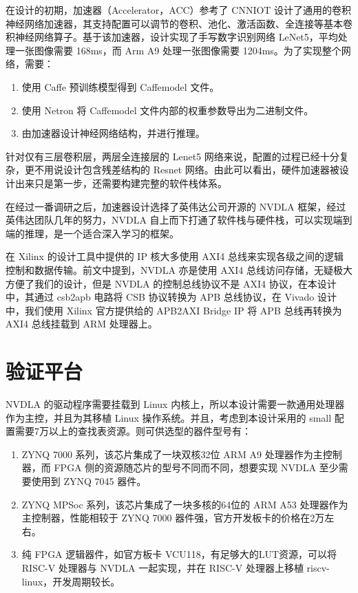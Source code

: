 在设计的初期，加速器（Accelerator，ACC）参考了 CNNIOT\cite{CNNIOT} 设计了通用的卷积神经网络加速器，其支持配置可以调节的卷积、池化、激活函数、全连接等基本卷积神经网络算子。基于该加速器，设计实现了手写数字识别网络 LeNet5，平均处理一张图像需要 168ms，而 Arm A9 处理一张图像需要 1204ms。为了实现整个网络，需要：

\begin{enumerate}
    \item 使用 Caffe 预训练模型得到 Caffemodel 文件。
    \item 使用 Netron 将 Caffemodel 文件内部的权重参数导出为二进制文件。
    \item 由加速器设计神经网络结构，并进行推理。
\end{enumerate}

针对仅有三层卷积层，两层全连接层的 Lenet5 网络来说，配置的过程已经十分复杂，更不用说设计包含残差结构的 Resnet 网络。由此可以看出，硬件加速器被设计出来只是第一步，还需要构建完整的软件栈体系。

在经过一番调研之后，加速器设计选择了英伟达公司开源的 NVDLA 框架，经过英伟达团队几年的努力，NVDLA 自上而下打通了软件栈与硬件栈，可以实现端到端的推理，是一个适合深入学习的框架。

在 Xilinx 的设计工具中提供的 IP 核大多使用 AXI4 总线来实现各级之间的逻辑控制和数据传输。前文中提到，NVDLA 亦是使用 AXI4 总线访问存储，无疑极大方便了我们的设计，但是 NVDLA 的控制总线协议不是 AXI4 协议，在本设计中，其通过 csb2apb 电路将 CSB 协议转换为 APB 总线协议，在 Vivado 设计中，我们使用 Xilinx 官方提供给的 APB2AXI Bridge IP 将 APB 总线再转换为 AXI4 总线挂载到 ARM 处理器上。

\section{验证平台}

NVDLA 的驱动程序需要挂载到 Linux 内核上，所以本设计需要一款通用处理器作为主控，并且为其移植 Linux 操作系统。并且，考虑到本设计采用的 small 配置需要7万以上的查找表资源。则可供选型的器件型号有：

\begin{enumerate}
    \item ZYNQ 7000 系列，该芯片集成了一块双核32位 ARM A9 处理器作为主控制器，而 FPGA 侧的资源随芯片的型号不同而不同，想要实现 NVDLA 至少需要使用到 ZYNQ 7045 器件。
    \item ZYNQ MPSoc 系列，该芯片集成了一块多核的64位的 ARM A53 处理器作为主控制器，性能相较于 ZYNQ 7000 器件强，官方开发板卡的价格在2万左右。
    \item 纯 FPGA 逻辑器件，如官方板卡 VCU118，有足够大的LUT资源，可以将 RISC-V 处理器与 NVDLA 一起实现，并在 RISC-V 处理器上移植 riscv-linux，开发周期较长。
\end{enumerate}

